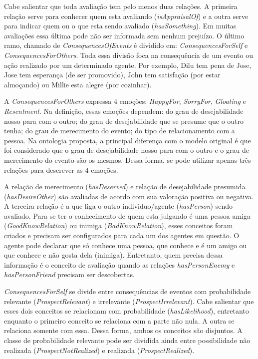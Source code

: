 Cabe salientar que toda avaliação tem pelo menos duas relações. A primeira
relação serve para conhecer quem esta avaliando (\emph{isAppraisalOf}) e a
outra serve para indicar quem ou o que esta sendo avaliado
(\emph{hasSomething}). Em muitas avaliações essa última pode não ser
informada sem nenhum prejuízo. O último ramo, chamado de
\emph{ConsequencesOfEvents} é dividido em: \emph{ConsequencesForSelf} e
\emph{ConsequencesForOthers}. Toda essa divisão foca na consequência de um
evento ou ação realizado por um determinado agente. Por exemplo, Dilu tem pena
de Jose, Jose tem esperança (de ser promovido), John tem satisfação (por
estar almoçando) ou Millie esta alegre (por cozinhar).

A \emph{ConsequencesForOthers} expressa 4 emoções: \emph{HappyFor},
\emph{SorryFor}, \emph{Gloating} e \emph{Resentment}. Na definição, essas
emoções dependem: do grau de desejabilidade nosso para com o outro; do grau de
desejabilidade que se presume que o outro tenha; do grau de merecimento do
evento; do tipo de relacionamento com a pessoa. Na ontologia proposta, a principal
diferença com o modelo original é que foi considerado que o grau de
desejabilidade nosso para com o outro e o grau de merecimento do evento são os
mesmos. Dessa forma, se pode utilizar apenas três relações para descrever as
4 emoções.

A relação de merecimento (\emph{hasDeserved}) e relação de desejabilidade
presumida (\emph{hasDesireOther}) são avaliadas de acordo com sua valoração
positiva ou negativa. A terceira relação é a que liga o outro individuo/agente
(\emph{hasPerson}) sendo avaliado. Para se ter o conhecimento de quem esta
julgando é uma pessoa amiga (\emph{GoodKnowRelation}) ou inimiga
(\emph{BadKnowRelation}), esses conceitos foram criados e precisam ser
configurados para cada um dos agentes em questão. O agente pode declarar que
só conhece uma pessoa, que conhece e é um amigo ou que conhece e não gosta
dela (inimiga). Entretanto, quem precisa dessa informação é o conceito de
avaliação quando as relações \emph{hasPersonEnemy} e \emph{hasPersonFriend}
precisam ser descobertas.

\emph{ConsequencesForSelf} se divide entre consequências de eventos com
probabilidade relevante (\emph{ProspectRelevant}) e irrelevante
(\emph{ProspectIrrelevant}). Cabe salientar que esses dois conceitos se
relacionam com probabilidade (\emph{hasLikelihood}), entretanto enquanto o
primeiro conceito se relaciona com a parte não nula. A outra se relaciona
somente com essa. Dessa forma, ambos os conceitos são disjuntos. A classe de
probabilidade relevante pode ser dividida ainda entre possibilidade não
realizada (\emph{ProspectNotRealized}) e realizada (\emph{ProspectRealized}).

